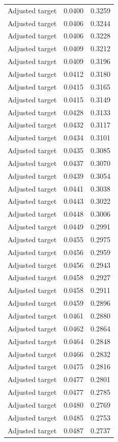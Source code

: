 \begin{table}[htbp]
\begin{tabular}{lll}
Adjusted target & 0.0400 & 0.3259 \\
Adjusted target & 0.0406 & 0.3244 \\
Adjusted target & 0.0406 & 0.3228 \\
Adjusted target & 0.0409 & 0.3212 \\
Adjusted target & 0.0409 & 0.3196 \\
Adjusted target & 0.0412 & 0.3180 \\
Adjusted target & 0.0415 & 0.3165 \\
Adjusted target & 0.0415 & 0.3149 \\
Adjusted target & 0.0428 & 0.3133 \\
Adjusted target & 0.0432 & 0.3117 \\
Adjusted target & 0.0434 & 0.3101 \\
Adjusted target & 0.0435 & 0.3085 \\
Adjusted target & 0.0437 & 0.3070 \\
Adjusted target & 0.0439 & 0.3054 \\
Adjusted target & 0.0441 & 0.3038 \\
Adjusted target & 0.0443 & 0.3022 \\
Adjusted target & 0.0448 & 0.3006 \\
Adjusted target & 0.0449 & 0.2991 \\
Adjusted target & 0.0455 & 0.2975 \\
Adjusted target & 0.0456 & 0.2959 \\
Adjusted target & 0.0456 & 0.2943 \\
Adjusted target & 0.0458 & 0.2927 \\
Adjusted target & 0.0458 & 0.2911 \\
Adjusted target & 0.0459 & 0.2896 \\
Adjusted target & 0.0461 & 0.2880 \\
Adjusted target & 0.0462 & 0.2864 \\
Adjusted target & 0.0464 & 0.2848 \\
Adjusted target & 0.0466 & 0.2832 \\
Adjusted target & 0.0475 & 0.2816 \\
Adjusted target & 0.0477 & 0.2801 \\
Adjusted target & 0.0477 & 0.2785 \\
Adjusted target & 0.0480 & 0.2769 \\
Adjusted target & 0.0485 & 0.2753 \\
Adjusted target & 0.0487 & 0.2737 \\

\end{tabular}
\end{table}
